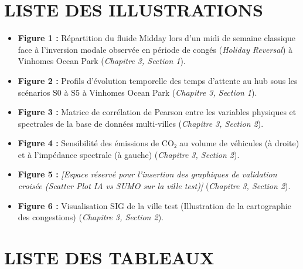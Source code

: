 \documentclass[10pt, a4paper]{article}
\providecommand{\tightlist}{}
\begin{document}
\newpage

\section{LISTE DES ILLUSTRATIONS}\label{liste-des-illustrations}

\begin{itemize}
\tightlist
\item
  \textbf{Figure 1 :} Répartition du fluide Midday lors d'un midi de
  semaine classique face à l'inversion modale observée en période de
  congés (\emph{Holiday Reversal}) à Vinhomes Ocean Park (\emph{Chapitre
  3, Section 1}).
\item
  \textbf{Figure 2 :} Profils d'évolution temporelle des temps d'attente
  au hub sous les scénarios S0 à S5 à Vinhomes Ocean Park
  (\emph{Chapitre 3, Section 1}).
\item
  \textbf{Figure 3 :} Matrice de corrélation de Pearson entre les
  variables physiques et spectrales de la base de données multi-villes
  (\emph{Chapitre 3, Section 2}).
\item
  \textbf{Figure 4 :} Sensibilité des émissions de CO₂ au volume de
  véhicules (à droite) et à l'impédance spectrale (à gauche)
  (\emph{Chapitre 3, Section 2}).
\item
  \textbf{Figure 5 :} \emph{{[}Espace réservé pour l'insertion des
  graphiques de validation croisée (Scatter Plot IA vs SUMO sur la ville
  test){]}} (\emph{Chapitre 3, Section 2}).
\item
  \textbf{Figure 6 :} Visualisation SIG de la ville test (Illustration
  de la cartographie des congestions) (\emph{Chapitre 3, Section 2}).
\end{itemize}

\newpage

\section{LISTE DES TABLEAUX}\label{liste-des-tableaux}
\end{document}

